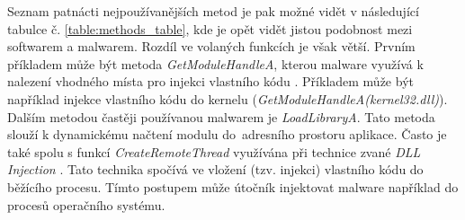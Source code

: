 Seznam patnácti nejpoužívanějších metod je pak možné vidět v následující tabulce č. \ref{table:methods_table}, kde je opět vidět jistou podobnost mezi softwarem a malwarem. Rozdíl ve volaných funkcích je však větší. Prvním příkladem může být metoda \emph{GetModuleHandleA}, kterou malware využívá k nalezení vhodného místa pro injekci vlastního kódu \cite{method_getmodulehandle}. Příkladem může být například injekce vlastního kódu do kernelu (\emph{GetModuleHandleA(kernel32.dll)}). Dalším metodou častěji používanou malwarem je \emph{LoadLibraryA}. Tato metoda slouží k dynamickému načtení modulu do~adresního prostoru aplikace. Často je také spolu s funkcí \emph{CreateRemoteThread} využívána při technice zvané \emph{DLL Injection} \cite{method_dllinjection}. Tato technika spočívá ve vložení (tzv. injekci) vlastního kódu do běžícího procesu. Tímto postupem může útočník injektovat malware například do procesů operačního systému. 

